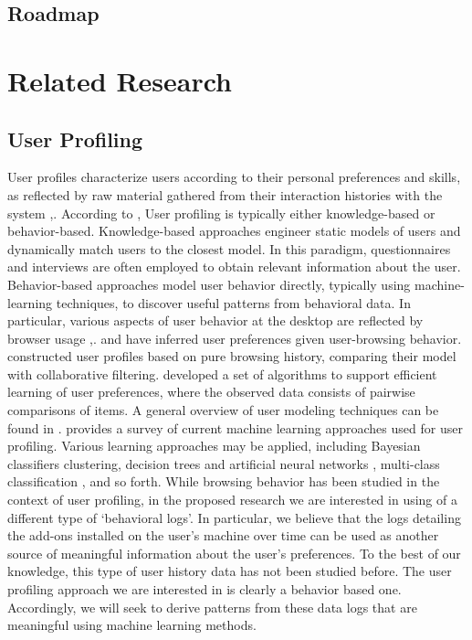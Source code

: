 \documentclass[11pt,oneside]{book}
\let\Oldsection\section
\renewcommand{\section}{\FloatBarrier\Oldsection}
\begin{document}
\section{Roadmap}
\label{sub:roadmap}




\chapter{Related Research}
\label{sec:related}


\section{User Profiling}

User profiles characterize users according to their personal
preferences and skills, as reflected by raw material gathered from
their interaction histories with the system \citep{koch2001software},\citep{gauch2007user}. According to \citep{gauch2007user}, User profiling is typically either knowledge-based or
behavior-based. Knowledge-based approaches engineer static models of
users and dynamically match users to the closest model. In this
paradigm, questionnaires and interviews are often employed to obtain
relevant information about the user. Behavior-based approaches model
user behavior directly, typically using machine-learning techniques,
to discover useful patterns from behavioral data. In particular,
various aspects of user behavior at the desktop are reflected by
browser usage \citep{benevenuto2009characterizing},\citep{bilenko11}. \citep{lieberman1995letizia} and \citep{joachims97} have inferred user preferences given user-browsing behavior. \citep{sugiyama2004adaptive} constructed user profiles based on pure browsing history,
comparing their model with collaborative filtering.  \citep{lu2011learning} developed a set of algorithms to support efficient
learning of user preferences, where the observed data consists of
pairwise comparisons of items.  A general overview of user modeling
techniques can be found in \citep{leontiadis2012don}. \citep{sebastiani02} \citep{sebastiani03} provides a survey of current machine learning
approaches used for user profiling.  Various learning approaches may
be applied, including Bayesian classifiers clustering, decision trees
and artificial neural networks \citep{pazzani97}, multi-class classification \cite{bauer2014analyzing},
and so forth.  While browsing behavior has been studied in the context
of user profiling, in the proposed research we are interested in using
of a different type of `behavioral logs'. In particular, we believe
that the logs detailing the add-ons installed on the user's machine
over time can be used as another source of meaningful information
about the user's preferences. To the best of our knowledge, this type
of user history data has not been studied before. The user profiling
approach we are interested in is clearly a behavior based
one. Accordingly, we will seek to derive patterns from these data logs
that are meaningful using machine learning methods.
\end{document}
